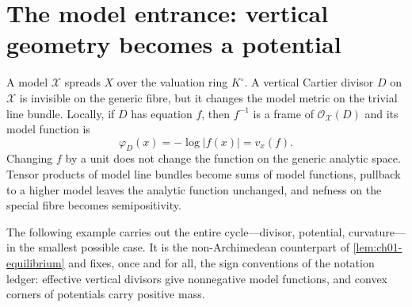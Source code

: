 \section{The model entrance: vertical geometry becomes a potential}
\label{sec:ch01-model-entrance}

A model $\mathcal X$ spreads $X$ over the valuation ring $K^\circ$.  A
vertical Cartier divisor $D$ on $\mathcal X$ is invisible on the generic
fibre, but it changes the model metric on the trivial line bundle. Locally,
if $D$ has equation $f$, then $f^{-1}$ is a frame of
$\mathcal O_{\mathcal X}(D)$ and its model function is
\[
                         \varphi_D(x)=-\log|f(x)|=v_x(f).
\]
Changing $f$ by a unit does not change the function on the generic analytic
space.  Tensor products of model line bundles become sums of model
functions, pullback to a higher model leaves the analytic function unchanged,
and nefness on the special fibre becomes semipositivity.

The following example carries out the entire cycle---divisor, potential,
curvature---in the smallest possible case.  It is the non-Archimedean
counterpart of \cref{lem:ch01-equilibrium} and fixes, once and for all, the
sign conventions of the notation ledger: effective vertical divisors give
nonnegative model functions, and convex corners of potentials carry positive
mass.


